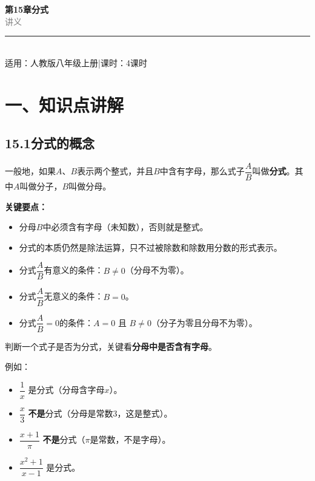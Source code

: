 \documentclass[12pt, a4paper]{ctexart}
\begin{document}
\begin{center}
{\Huge\bfseries\textcolor{mainblue}{第15章\quad 分\quad 式}}\\[12pt]
{\Large\textcolor{gray}{讲\quad 义}}\\[8pt]
\rule{0.6\textwidth}{1pt}\\[8pt]
{\normalsize 适用：人教版\quad 八年级上册\quad |\quad 课时：4课时}
\end{center}
\vspace{10pt}

\section*{\textcolor{mainblue}{一、知识点讲解}}

\subsection*{15.1\quad 分式的概念}

\begin{knowledgebox}[定义：分式]
一般地，如果$A$、$B$表示两个整式，并且$B$中含有字母，那么式子$\dfrac{A}{B}$叫做\textbf{分式}。其中$A$叫做分子，$B$叫做分母。

\medskip
\textbf{关键要点：}
\begin{itemize}[leftmargin=2em]
  \item 分母$B$中必须含有字母（未知数），否则就是整式。
  \item 分式的本质仍然是除法运算，只不过被除数和除数用分数的形式表示。
  \item 分式$\dfrac{A}{B}$有意义的条件：$B \neq 0$（分母不为零）。
  \item 分式$\dfrac{A}{B}$无意义的条件：$B = 0$。
  \item 分式$\dfrac{A}{B} = 0$的条件：$A = 0$ 且 $B \neq 0$（分子为零且分母不为零）。
\end{itemize}
\end{knowledgebox}

\begin{warnbox}
判断一个式子是否为分式，关键看\textbf{分母中是否含有字母}。

\medskip
例如：
\begin{itemize}[leftmargin=2em]
  \item $\dfrac{1}{x}$ 是分式（分母含字母$x$）。
  \item $\dfrac{x}{3}$ \textbf{不是}分式（分母是常数3，这是整式）。
  \item $\dfrac{x+1}{\pi}$ \textbf{不是}分式（$\pi$是常数，不是字母）。
  \item $\dfrac{x^2+1}{x-1}$ 是分式。
\end{itemize}
\end{warnbox}
\end{document}
